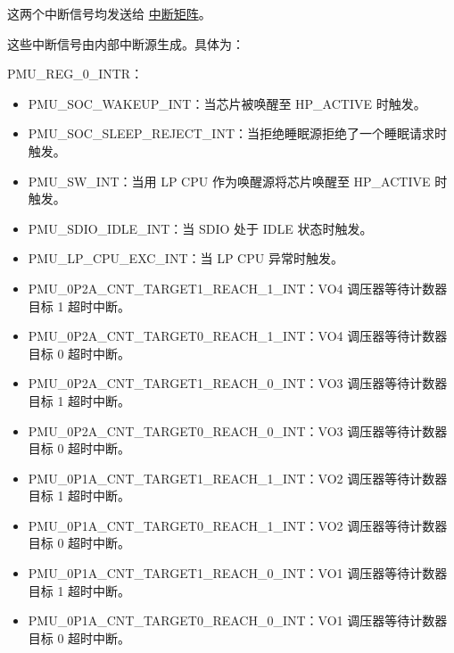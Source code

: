 \documentclass[main\_\_CN.tex]{subfiles}
\begin{document}
这两个中断信号均发送给 \hyperref[mod:intmtrx]{中断矩阵}。

这些中断信号由内部中断源生成。具体为：

PMU\_REG\_0\_INTR：

\begin{itemize}
\item \label{int:PMUSOCWAKEUPINT}PMU\_SOC\_WAKEUP\_INT：当芯片被唤醒至 HP\_ACTIVE 时触发。

\item \label{int:PMUSOCSLEEPREJECTINT}PMU\_SOC\_SLEEP\_REJECT\_INT：当拒绝睡眠源拒绝了一个睡眠请求时触发。

\item \label{int:PMUSWINT}PMU\_SW\_INT：当用 LP CPU 作为唤醒源将芯片唤醒至 HP\_ACTIVE 时触发。
\item \label{int:PMUSDIOIDLEINT}PMU\_SDIO\_IDLE\_INT：当 SDIO 处于 IDLE 状态时触发。
\item \label{int:PMULPCPUEXCINT}PMU\_LP\_CPU\_EXC\_INT：当 LP CPU 异常时触发。
\item \label{int:PMU0P2ACNTTARGET1REACH1INT}PMU\_0P2A\_CNT\_TARGET1\_REACH\_1\_INT：VO4 调压器等待计数器目标 1 超时中断。
\item \label{int:PMU0P2ACNTTARGET0REACH1INT}PMU\_0P2A\_CNT\_TARGET0\_REACH\_1\_INT：VO4 调压器等待计数器目标 0 超时中断。
\item \label{int:PMU0P2ACNTTARGET1REACH0INT}PMU\_0P2A\_CNT\_TARGET1\_REACH\_0\_INT：VO3 调压器等待计数器目标 1 超时中断。
\item \label{int:PMU0P2ACNTTARGET0REACH0INT}PMU\_0P2A\_CNT\_TARGET0\_REACH\_0\_INT：VO3 调压器等待计数器目标 0 超时中断。
\item \label{int:PMU0P1ACNTTARGET1REACH1INT}PMU\_0P1A\_CNT\_TARGET1\_REACH\_1\_INT：VO2 调压器等待计数器目标 1 超时中断。
\item \label{int:PMU0P1ACNTTARGET0REACH1INT}PMU\_0P1A\_CNT\_TARGET0\_REACH\_1\_INT：VO2 调压器等待计数器目标 0 超时中断。
\item \label{int:PMU0P1ACNTTARGET1REACH0INT}PMU\_0P1A\_CNT\_TARGET1\_REACH\_0\_INT：VO1 调压器等待计数器目标 1 超时中断。
\item \label{int:PMU0P1ACNTTARGET0REACH0INT}PMU\_0P1A\_CNT\_TARGET0\_REACH\_0\_INT：VO1 调压器等待计数器目标 0 超时中断。
\end{itemize}
\end{document}
